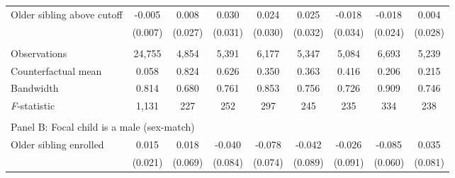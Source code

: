 \begin{table}[!htbp]
{{\begin{tabular}{lcccccccc}
Older sibling above cutoff&      -0.005   &       0.008   &       0.030   &       0.024   &       0.025   &      -0.018   &      -0.018   &       0.004   \\
                    &     (0.007)   &     (0.027)   &     (0.031)   &     (0.030)   &     (0.032)   &     (0.034)   &     (0.024)   &     (0.028)   \\
                    &               &               &               &               &               &               &               &               \\
Observations        &      24,755   &       4,854   &       5,391   &       6,177   &       5,347   &       5,084   &       6,693   &       5,239   \\
Counterfactual mean &       0.058   &       0.824   &       0.626   &       0.350   &       0.363   &       0.416   &       0.206   &       0.215   \\
Bandwidth           &       0.814   &       0.680   &       0.761   &       0.853   &       0.756   &       0.726   &       0.909   &       0.746   \\
\textit{F}-statistic&       1,131   &         227   &         252   &         297   &         245   &         235   &         334   &         238   \\
 
&  &  &  &  \\
\multicolumn{10}{l}{Panel B: Focal child is a male (sex-match)} \\
Older sibling enrolled&       0.015   &       0.018   &      -0.040   &      -0.078   &      -0.042   &      -0.026   &      -0.085   &       0.035   \\
                    &     (0.021)   &     (0.069)   &     (0.084)   &     (0.074)   &     (0.089)   &     (0.091)   &     (0.060)   &     (0.081)   \\
 

\end{tabular}}}
\end{table}
